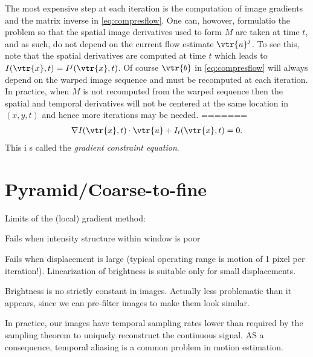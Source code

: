 \begin{compactdesc}
The most expensive step at each iteration is the computation of image gradients and the matrix inverse in \ref{eq:compresflow}. One can, howover, formulatio the problem so that the spatial image derivatives used to form $M$ are taken at time $t$, and as such, do not depend on the current flow estimate $\vtr{u}^j$. To see this, note that the spatial derivatives are computed at time $t$ which leads to $I(\vtr{x},t)=I^j(\vtr{x},t)$. Of course $\vtr{b}$ in \ref{eq:compresflow} will always depend on the warped image sequence and must be recomputed at each iteration. In practice, when $M$ is not recomputed from the warped sequence then the spatial and temporal derivatives will not be centered at the same location in $(x,y,t)$ and hence more iterations may be needed.
=======
\begin{gather*}
	\nabla I(\vtr{x},t)\cdot\vtr{u}+I_t(\vtr{x},t)=0.
\end{gather*}
This i s called the \emph{gradient constraint equation}.
\section{Pyramid/Coarse-to-fine}
Limits of the (local) gradient method:
\begin{enumerate*}[label=\protect\circled{\arabic*},itemjoin=]
	\item Fails when intensity structure within window is poor\\
	\item Fails when displacement is large (typical operating range is motion of 1 pixel per iteration!). Linearization of brightness is suitable only for small displacements. \\
	\item Brightness is no strictly constant in images. Actually less problematic than it appears, since we can pre-filter images to make them look similar.\\
\end{enumerate*}

In practice, our images have temporal sampling rates lower than required by the sampling theorem to uniquely reconstruct the continuous signal. AS a consequence, temporal aliasing is a common problem in motion estimation.


\end{compactdesc}
